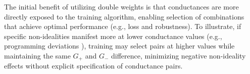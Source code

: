 
\noindent The initial benefit of utilizing double weights is that conductances are more directly exposed to the training algorithm, enabling selection of combinations that achieve optimal performance (e.g., loss and robustness). To illustrate, if specific non-idealities manifest more at lower conductance values (e.g., programming deviations \cite{kim2016voltage}), training may select pairs at higher values while maintaining the same $G_+$ and $G_-$ difference, minimizing negative non-ideality effects without explicit specification of conductance pairs.\\



